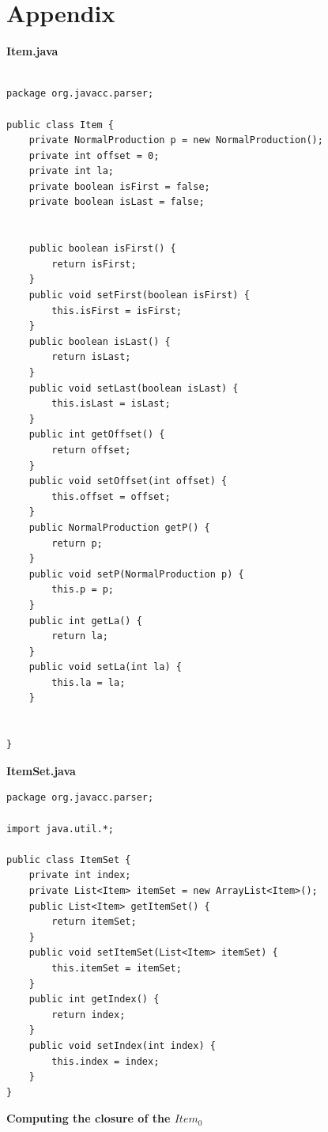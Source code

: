 \documentclass[•]{book}
\begin{document}
\chapter*{Appendix}
\textbf{Item.java}
\begin{lstlisting}

package org.javacc.parser;

public class Item {
	private NormalProduction p = new NormalProduction();
	private int offset = 0;
	private int la;
	private boolean isFirst = false;
	private boolean isLast = false;

	
	public boolean isFirst() {
		return isFirst;
	}
	public void setFirst(boolean isFirst) {
		this.isFirst = isFirst;
	}
	public boolean isLast() {
		return isLast;
	}
	public void setLast(boolean isLast) {
		this.isLast = isLast;
	}
	public int getOffset() {
		return offset;
	}
	public void setOffset(int offset) {
		this.offset = offset;
	}
	public NormalProduction getP() {
		return p;
	}
	public void setP(NormalProduction p) {
		this.p = p;
	}
	public int getLa() {
		return la;
	}
	public void setLa(int la) {
		this.la = la;
	}
	

}

\end{lstlisting}

\textbf{ItemSet.java}

\begin{lstlisting}
package org.javacc.parser;

import java.util.*;

public class ItemSet {
	private int index;
	private List<Item> itemSet = new ArrayList<Item>();
	public List<Item> getItemSet() {
		return itemSet;
	}
	public void setItemSet(List<Item> itemSet) {
		this.itemSet = itemSet;
	}
	public int getIndex() {
		return index;
	}
	public void setIndex(int index) {
		this.index = index;
	}
}

\end{lstlisting}

\textbf{Computing the closure of the $Item_0$}
\end{document}
